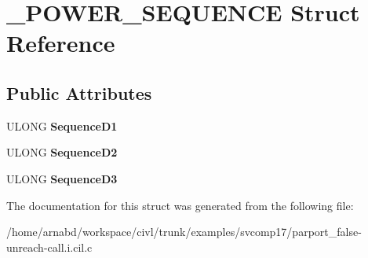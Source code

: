 \hypertarget{struct__POWER__SEQUENCE}{}\section{\+\_\+\+P\+O\+W\+E\+R\+\_\+\+S\+E\+Q\+U\+E\+N\+C\+E Struct Reference}
\label{struct__POWER__SEQUENCE}
\subsection*{Public Attributes}
\begin{DoxyCompactItemize}
\item 
\hypertarget{struct__POWER__SEQUENCE_aadf4f1b8aae42bd67ba02bac10fb136a}{}U\+L\+O\+N\+G {\bfseries Sequence\+D1}\label{struct__POWER__SEQUENCE_aadf4f1b8aae42bd67ba02bac10fb136a}

\item 
\hypertarget{struct__POWER__SEQUENCE_a14fe0f711af57a28608641c44d6bf3b1}{}U\+L\+O\+N\+G {\bfseries Sequence\+D2}\label{struct__POWER__SEQUENCE_a14fe0f711af57a28608641c44d6bf3b1}

\item 
\hypertarget{struct__POWER__SEQUENCE_add7b16ef36166f7cbab3535e962ab104}{}U\+L\+O\+N\+G {\bfseries Sequence\+D3}\label{struct__POWER__SEQUENCE_add7b16ef36166f7cbab3535e962ab104}

\end{DoxyCompactItemize}


The documentation for this struct was generated from the following file\+:\begin{DoxyCompactItemize}
\item 
/home/arnabd/workspace/civl/trunk/examples/svcomp17/parport\+\_\+false-\/unreach-\/call.\+i.\+cil.\+c\end{DoxyCompactItemize}
